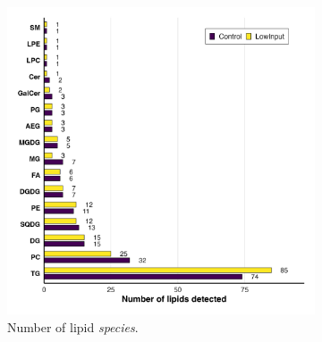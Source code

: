 \documentclass[10pt,letterpaper]{article}
\begin{document}
\begin{figure}[htp]
  \centering

  \begin{subfigure}[t]{0.48\textwidth}
    \includegraphics[width=\linewidth]{fig/supp/SuppFig_3A_Lipid_Counts}
    \caption{Number of lipid \textit{species}.}
    \label{fig:S3A}
  \end{subfigure}\hfill
  \begin{subfigure}[t]{0.48\textwidth}

\end{subfigure}
\end{figure}
\end{document}
